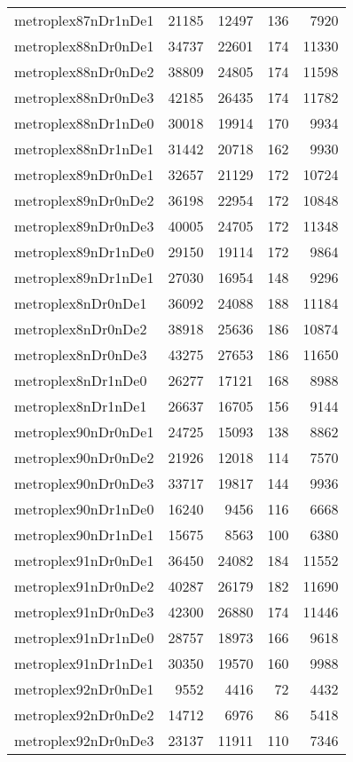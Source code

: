 \begin{longtable}{lrrrr}
metroplex87nDr1nDe1 & 21185 & 12497 & 136 & 7920 \\
metroplex88nDr0nDe1 & 34737 & 22601 & 174 & 11330 \\
metroplex88nDr0nDe2 & 38809 & 24805 & 174 & 11598 \\
metroplex88nDr0nDe3 & 42185 & 26435 & 174 & 11782 \\
metroplex88nDr1nDe0 & 30018 & 19914 & 170 & 9934 \\
metroplex88nDr1nDe1 & 31442 & 20718 & 162 & 9930 \\
metroplex89nDr0nDe1 & 32657 & 21129 & 172 & 10724 \\
metroplex89nDr0nDe2 & 36198 & 22954 & 172 & 10848 \\
metroplex89nDr0nDe3 & 40005 & 24705 & 172 & 11348 \\
metroplex89nDr1nDe0 & 29150 & 19114 & 172 & 9864 \\
metroplex89nDr1nDe1 & 27030 & 16954 & 148 & 9296 \\
metroplex8nDr0nDe1 & 36092 & 24088 & 188 & 11184 \\
metroplex8nDr0nDe2 & 38918 & 25636 & 186 & 10874 \\
metroplex8nDr0nDe3 & 43275 & 27653 & 186 & 11650 \\
metroplex8nDr1nDe0 & 26277 & 17121 & 168 & 8988 \\
metroplex8nDr1nDe1 & 26637 & 16705 & 156 & 9144 \\
metroplex90nDr0nDe1 & 24725 & 15093 & 138 & 8862 \\
metroplex90nDr0nDe2 & 21926 & 12018 & 114 & 7570 \\
metroplex90nDr0nDe3 & 33717 & 19817 & 144 & 9936 \\
metroplex90nDr1nDe0 & 16240 & 9456 & 116 & 6668 \\
metroplex90nDr1nDe1 & 15675 & 8563 & 100 & 6380 \\
metroplex91nDr0nDe1 & 36450 & 24082 & 184 & 11552 \\
metroplex91nDr0nDe2 & 40287 & 26179 & 182 & 11690 \\
metroplex91nDr0nDe3 & 42300 & 26880 & 174 & 11446 \\
metroplex91nDr1nDe0 & 28757 & 18973 & 166 & 9618 \\
metroplex91nDr1nDe1 & 30350 & 19570 & 160 & 9988 \\
metroplex92nDr0nDe1 & 9552 & 4416 & 72 & 4432 \\
metroplex92nDr0nDe2 & 14712 & 6976 & 86 & 5418 \\
metroplex92nDr0nDe3 & 23137 & 11911 & 110 & 7346 \\

\end{longtable}

